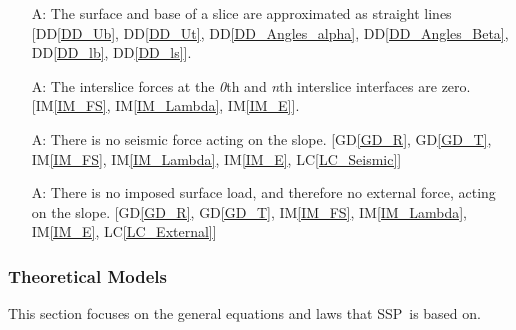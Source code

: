 \documentclass[12pt]{article}
\newcommand{\progname}{SSP}
\newcounter{assumpnum} %
\newcommand{\iref}[1]{IM\ref{#1}}
\newcommand{\ddref}[1]{DD\ref{#1}}
\newcommand{\dref}[1]{GD\ref{#1}}
\newcommand{\lcref}[1]{LC\ref{#1}}
\begin{document}
\begin{enumerate}[label=A\arabic*:,ref={\arabic*}]
\item [A\refstepcounter{assumpnum}\theassumpnum: \label{A_Straight}]
  The surface and base of a slice are approximated as straight lines 
  [\ddref{DD_Ub}, \ddref{DD_Ut}, \ddref{DD_Angles_alpha}, 
  \ddref{DD_Angles_Beta}, \ddref{DD_lb}, \ddref{DD_ls}].
  
\item [A\refstepcounter{assumpnum}\theassumpnum: \label{A_EdgeSlices}] The 
interslice forces at the \textit{0}th and \textit{n}th interslice interfaces 
are zero. [\iref{IM_FS}, \iref{IM_Lambda}, \iref{IM_E}].
  
\item [A\refstepcounter{assumpnum}\theassumpnum: \label{A_Seismic}] There is no 
seismic force acting on the slope. [\dref{GD_R}, \dref{GD_T}, \iref{IM_FS}, 
\iref{IM_Lambda}, \iref{IM_E}, \lcref{LC_Seismic}]
  
\item [A\refstepcounter{assumpnum}\theassumpnum: \label{A_External}] There is 
no imposed surface load, and therefore no external force, acting on the slope. 
[\dref{GD_R}, \dref{GD_T}, \iref{IM_FS}, \iref{IM_Lambda}, \iref{IM_E}, 
\lcref{LC_External}]

\end{enumerate}

\subsubsection{Theoretical Models} \label{sec_theoretical}

This section focuses on the general equations and laws that \progname\ is based
on.

~\newline
\end{document}
